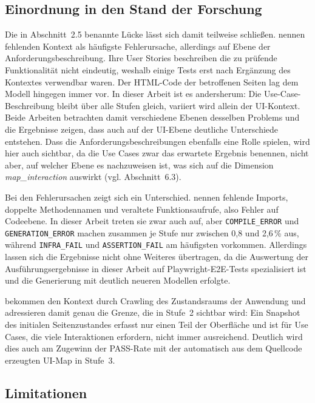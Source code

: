 \subsection{Einordnung in den Stand der Forschung}

Die in Abschnitt~2.5 benannte Lücke lässt sich damit teilweise schließen. \textcite{ferreira_acceptance_2025} nennen fehlenden Kontext als häufigste Fehlerursache, allerdings auf Ebene der Anforderungsbeschreibung. Ihre User Stories beschreiben die zu prüfende Funktionalität nicht eindeutig, weshalb einige Tests erst nach Ergänzung des Kontextes verwendbar waren. Der \ac{HTML}-Code der betroffenen Seiten lag dem Modell hingegen immer vor. In dieser Arbeit ist es andersherum: Die Use-Case-Beschreibung bleibt über alle Stufen gleich, variiert wird allein der \ac{UI}-Kontext. Beide Arbeiten betrachten damit verschiedene Ebenen desselben Problems und die Ergebnisse zeigen, dass auch auf der \ac{UI}-Ebene deutliche Unterschiede entstehen. Dass die Anforderungsbeschreibungen ebenfalls eine Rolle spielen, wird hier auch sichtbar, da die Use Cases zwar das erwartete Ergebnis benennen, nicht aber, auf welcher Ebene es nachzuweisen ist, was sich auf die Dimension \emph{map\_interaction} auswirkt (vgl. Abschnitt~6.3).

Bei den Fehlerursachen zeigt sich ein Unterschied. \textcite{plein_automatic_2023} nennen fehlende Imports, doppelte Methodennamen und veraltete Funktionsaufrufe, also Fehler auf Codeebene. In dieser Arbeit treten sie zwar auch auf, aber \texttt{COMPILE\_ERROR} und \texttt{GENERATION\_ERROR} machen zusammen je Stufe nur zwischen 0,8 und 2,6\,\% aus, während \texttt{INFRA\_FAIL} und \texttt{ASSERTION\_FAIL} am häufigsten vorkommen. Allerdings lassen sich die Ergebnisse nicht ohne Weiteres übertragen, da die Auswertung der Ausführungsergebnisse in dieser Arbeit auf Playwright-\ac{E2E}-Tests spezialisiert ist und die Generierung mit deutlich neueren Modellen erfolgte.

\textcite{alian_feature-driven_2024} bekommen den Kontext durch Crawling des Zustandsraums der Anwendung und adressieren damit genau die Grenze, die in Stufe~2 sichtbar wird: Ein Snapshot des initialen Seitenzustandes erfasst nur einen Teil der Oberfläche und ist für Use Cases, die viele Interaktionen erfordern, nicht immer ausreichend. Deutlich wird dies auch am Zugewinn der PASS-Rate mit der automatisch aus dem Quellcode erzeugten \ac{UI}-Map in Stufe~3.

\subsection{Limitationen}

